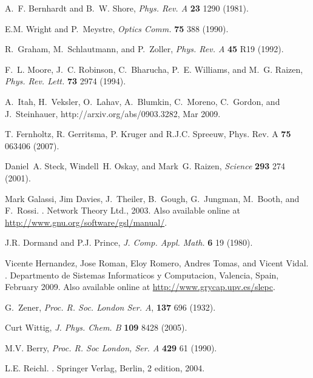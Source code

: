 \documentclass{article}
\begin{document}
\begin{thebibliography}{99}
A.~F. Bernhardt and B.~W. Shore, {\em Phys. Rev. A} {\bf 23} 1290 (1981).

E.M. Wright and P.~Meystre, {\em Optics Comm.} {\bf 75} 388 (1990).

R.~Graham, M.~Schlautmann, and P.~Zoller,  {\em Phys. Rev. A} {\bf 45} R19 (1992).

F.~L. Moore, J.~C. Robinson, C.~Bharucha, P.~E. Williams, and M.~G. Raizen,  {\em Phys. Rev. Lett.} {\bf 73} 2974 (1994).

A.~Itah, H.~Veksler, O.~Lahav, A.~Blumkin, C.~Moreno, C.~Gordon, and
  J.~Steinhauer, {http://arxiv.org/abs/0903.3282}, Mar 2009.

T. Fernholtz, R. Gerritsma, P. Kruger and R.J.C. Spreeuw, Phys. Rev. A {\bf 75} 063406 (2007).

Daniel~A. Steck, Windell~H. Oskay, and Mark~G. Raizen,  {\em Science}  {\bf 293} 274 (2001).

Mark Galassi, Jim Davies, J.~Theiler, B.~Gough, G.~Jungman, M.~Booth, and
  F.~Rossi.
.
\newblock Network Theory Ltd., 2003.
\newblock Also available online at
  \url{http://www.gnu.org/software/gsl/manual/}.

J.R. Dormand and P.J. Prince,  {\em J. Comp. Appl. Math.} {\bf 6} 19 (1980).

Vicente Hernandez, Jose Roman, Eloy Romero, Andres Tomas, and Vicent Vidal.
.
\newblock Departmento de Sistemas Informaticos y Computacion, Valencia, Spain,
  February 2009.
\newblock Also available online at \url{http://www.grycap.upv.es/slepc}.

G.~Zener,  {\em Proc. R. Soc. London Ser. A}, {\bf 137} 696 (1932).

Curt Wittig,  {\em  J.  Phys. Chem. B} {\bf 109} 8428 (2005).

M.V. Berry,  {\em Proc. R. Soc London, Ser. A} {\bf 429} 61 (1990).

L.E. Reichl.
.
\newblock Springer {V}erlag, Berlin, 2 edition, 2004.

\end{thebibliography}
%
\end{document}
